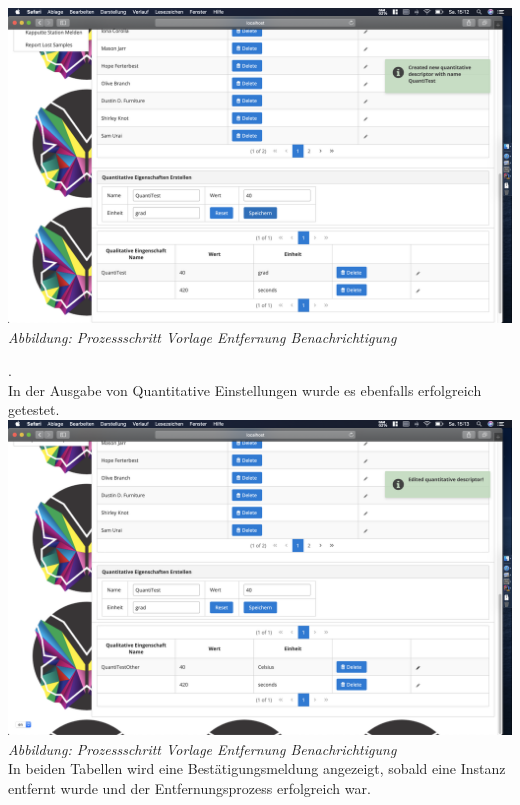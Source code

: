 \documentclass[enabledeprecatedfontcommands,fontsize=12pt,paper=a4,twoside]{scrartcl}
\begin{document}
\hypertarget{sc3.3.3.7}{
\includegraphics[width=1\textwidth]{Screenshots/336AddQuantitativMeldung.png}
\textit{Abbildung: Prozessschritt Vorlage Entfernung Benachrichtigung}
} .\\
In der Ausgabe von Quantitative Einstellungen wurde es ebenfalls erfolgreich getestet.\\
\hypertarget{sc3.3.3.7}{
\includegraphics[width=1\textwidth]{Screenshots/336EditMeldungQuantDes.png}
\textit{Abbildung: Prozessschritt Vorlage Entfernung Benachrichtigung}
}  \\
In beiden Tabellen wird eine Bestätigungsmeldung angezeigt, sobald eine Instanz entfernt wurde und der Entfernungsprozess erfolgreich war.\\
\end{document}
